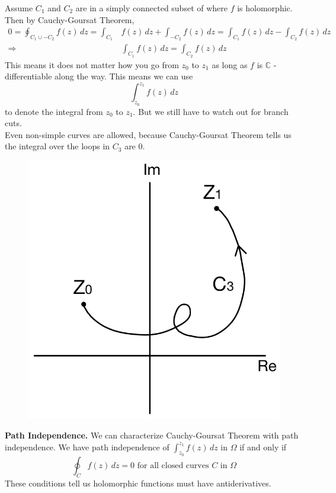 \documentclass[11pt]{article}
\begin{document}
Assume $C_1$ and $C_2$ are in a simply connected subset of where $f$ is holomorphic. Then by Cauchy-Goursat Theorem, 
\begin{align*}
0 = \oint_{C_1 \cup -C_2}f(z) \,dz  = \int_{C_1}&f(z) \,dz + \int_{-C_2}f(z) \,dz = \int_{C_1}f(z) \,dz - \int_{C_2}f(z) \,dz \\
\Longrightarrow &\int_{C_1}f(z) \,dz = \int_{C_2}f(z) \,dz
\end{align*}
This means it does not matter how you go from $z_0$ to $z_1$ as long as $f$ is $\mathbb{C}$ -differentiable along the way. This means we can use 
$$\int_{z_0}^{z_1}f(z)\,dz$$ 
to denote the integral from $z_0$ to $z_1$. But we still have to watch out for branch cuts. \\
Even non-simple curves are allowed, because Cauchy-Goursat Theorem tells us the integral over the loops in $C_3$ are 0. 
\begin{figure}[H]
\includegraphics[scale = 0.2]{12_2}
\centering
\end{figure}
\textbf{Path Independence.} We can characterize Cauchy-Goursat Theorem with path independence. We have path independence of $\int_{z_0}^{z_1}f(z) \,dz$ in $\Omega$ if and only if 
$$ \oint_C f(z) \,dz = 0 \text{ for all closed curves } C \text{ in } \Omega $$
These conditions tell us holomorphic functions must have antiderivatives. 
\end{document}
